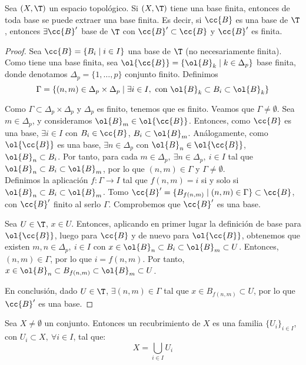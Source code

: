 \begin{prop}
    Sea $(X,\T)$ un espacio topológico. Si $(X,\T)$ tiene una base finita, entonces de toda base se puede extraer una base finita. Es decir, si $\cc{B}$ es una base de $\T$, entonces $\exists \cc{B}'$ base de $\T$ con $\cc{B}'\subset \cc{B}$ y $\cc{B}'$ es finita.
\end{prop}
\begin{proof}
    Sea $\cc{B}=\{B_i\mid i\in I\}$ una base de $\T$ (no necesariamente finita). Como tiene una base finita, sea $\ol{\cc{B}}=\{\ol{B}_k\mid k\in \Delta_p\}$ base finita, donde denotamos $\Delta_p=\{1,\dots,p\}$ conjunto finito. Definimos
    $$\Gamma = \{(n,m)\in \Delta_p\times \Delta_p\mid \exists i\in I,\text{ con } \ol{B}_k \subset B_i\subset \ol{B}_k\}$$

    Como $\Gamma \subset \Delta_p\times \Delta_p$ y $\Delta_p$ es finito, tenemos que es finito. Veamos que $\Gamma\neq \emptyset$. Sea $m\in \Delta_p$, y consideramos $\ol{B}_m\in \ol{\cc{B}}$. Entonces, como $\cc{B}$ es una base, $\exists i\in I$ con $B_i\in \cc{B}$, $B_i\subset \ol{B}_m$. Análogamente, como $\ol{\cc{B}}$ es una base, $\exists n\in \Delta_p$ con $\ol{B}_n\in \ol{\cc{B}}$, $\ol{B}_n\subset B_i$. Por tanto, para cada $m\in \Delta_p,~\exists n\in \Delta_p,~i\in I$ tal que $\ol{B}_n \subset B_i\subset \ol{B}_m$, por lo que $(n,m)\in \Gamma$ y $\Gamma\neq \emptyset$.\\
    
    Definimos la aplicación $f:\Gamma\to I$ tal que $f(n,m)=i$ si y solo si $\ol{B}_n\subset B_{i}\subset \ol{B}_m$. Tomo $\cc{B}'=\{B_{f(n,m)}\mid (n,m)\in \Gamma\}\subset \cc{B}$, con $\cc{B}'$ finito al serlo $\Gamma$. Comprobemos que $\cc{B}'$ es una base.

    Sea $U\in \T$, $x\in U$. Entonces, aplicando en primer lugar la definición de base para $\ol{\cc{B}}$, luego para $\cc{B}$ y de nuevo para $\ol{\cc{B}}$, obtenemos que existen $m,n\in \Delta_p,~i\in I$ con $x\in \ol{B}_n\subset B_i\subset \ol{B}_m\subset U$. Entonces, $(n,m)\in \Gamma$, por lo que $i=f(n,m)$. Por tanto, $x\in \ol{B}_n\subset B_{f(n,m)}\subset \ol{B}_m\subset U$.
    
    En conclusión, dado $U\in \T$, $\exists (n,m)\in \Gamma$ tal que $x\in B_{f(n,m)}\subset U$, por lo que $\cc{B}'$ es una base.
\end{proof}

\begin{definicion}[Recubrimiento]
    Sea $X\neq \emptyset$ un conjunto. Entonces un recubrimiento de $X$ es una familia $\{U_i\}_{i\in I}$, con $U_i\subset X,~\forall i\in I$, tal que:
    \begin{equation*}
        X=\bigcup_{i\in I} U_i
    \end{equation*}
\end{definicion}

